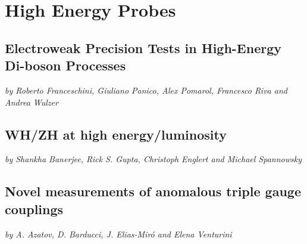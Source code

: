 \documentclass[../report.tex]{subfiles}
\providecommand{\main}{..}
\begin{document}
\section{High Energy Probes}
\label{sec4}






\subsection{Electroweak Precision Tests  in High-Energy Di-boson Processes} \label{WZlong}
\begin{center}
{\it by Roberto Franceschini,  Giuliano Panico,  Alex Pomarol,
  Francesco Riva  and Andrea Wulzer}
\end{center}






\subsection{WH/ZH at high energy/luminosity}\label{sec:ZHWZeft}
\begin{center}
{\it by Shankha Banerjee,  Rick S. Gupta,  Christoph Englert and Michael Spannowsky}
\end{center}





\subsection{Novel measurements of anomalous triple gauge couplings} \label{sec:WZtrans}
\begin{center}
{\it by A. Azatov, D. Barducci, J. Elias-Mir\'o and Elena Venturini}
\end{center}

\end{document}
